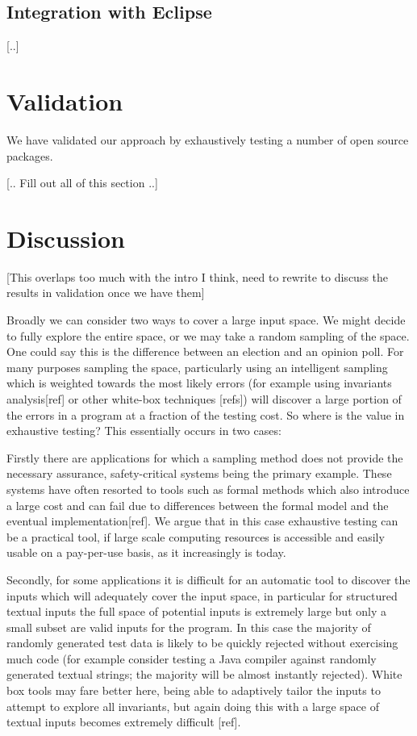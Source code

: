 \documentclass[10pt,journal,cspaper,compsoc]{IEEEtran}
\begin{document}
\subsection{Integration with Eclipse}

[..]

\section{Validation}

We have validated our approach by exhaustively testing a number of open source packages. 

[.. Fill out all of this section ..]

\section{Discussion}

[This overlaps too much with the intro I think, need to rewrite to discuss the results in validation once we have them]

Broadly we can consider two ways to cover a large input space. We might decide to fully explore the entire space, or we may take a random sampling of the space. One could say this is the difference between an election and an opinion poll. For many purposes sampling the space, particularly using an intelligent sampling which is weighted towards the most likely errors (for example using invariants analysis[ref] or other white-box techniques [refs]) will discover a large portion of the errors in a program at a fraction of the testing cost. So where is the value in exhaustive testing? This essentially occurs in two cases: 

Firstly there are applications for which a sampling method does not provide the necessary assurance, safety-critical systems being the primary example. These systems have often resorted to tools such as formal methods which also introduce a large cost and can fail due to differences between the formal model and the eventual implementation[ref]. We argue that in this case exhaustive testing can be a practical tool, if large scale computing resources is accessible and easily usable on a pay-per-use basis, as it increasingly is today.

Secondly, for some applications it is difficult for an automatic tool to discover the inputs which will adequately cover the input space, in particular for structured textual inputs the full space of potential inputs is extremely large but only a small subset are valid inputs for the program. In this case the majority of randomly generated test data is likely to be quickly rejected without exercising much code (for example consider testing a Java compiler against randomly generated textual strings; the majority will be almost instantly rejected). White box tools may fare better here, being able to adaptively tailor the inputs to attempt to explore all invariants, but again doing this with a large space of textual inputs becomes extremely difficult [ref]. 
\end{document}
